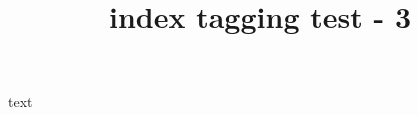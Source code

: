 \documentclass{article}
\title{index tagging test - 3}
\begin{document}
text

\printindex
\end{document}
